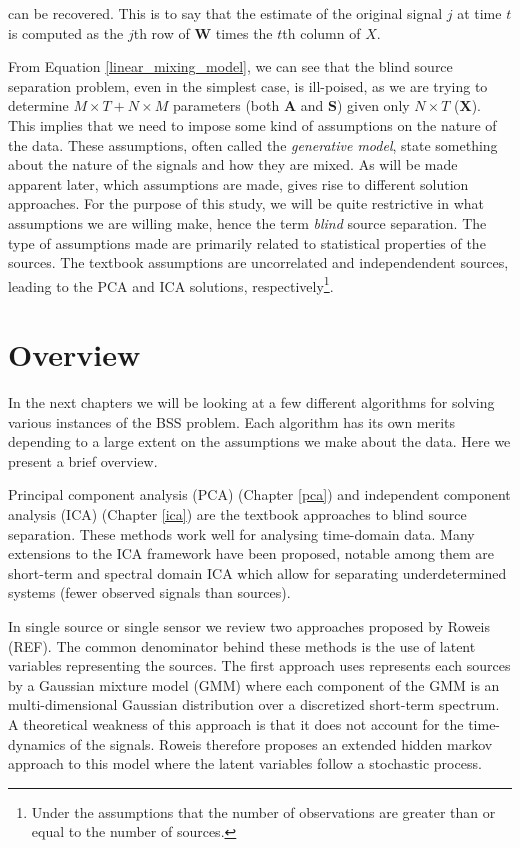 \documentclass[11pt, oneside, a4paper]{report}
\begin{document}
can be recovered. This is to say that the estimate of the original
signal $j$ at time $t$ is computed as the $j$th row of $\boldsymbol{W}$ times the
$t$th column of $X$.

From Equation \ref{linear_mixing_model}, we can see that the blind
source separation problem, even in the simplest case, is ill-poised,
as we are trying to determine $M\times T + N\times M$ parameters (both
$\boldsymbol{A}$ and $\boldsymbol{S}$) given only $N\times T$
($\boldsymbol{X}$). This implies that we need to impose some kind of
assumptions on the nature of the data. These assumptions, often called
the \emph{generative model}, state something about the nature of the
signals and how they are mixed. As will be made apparent later, which
assumptions are made, gives rise to different solution approaches. For
the purpose of this study, we will be quite restrictive in what
assumptions we are willing make, hence the term \emph{blind} source
separation. The type of assumptions made are primarily related to
statistical properties of the sources. The textbook assumptions are
uncorrelated and independendent sources, leading to the PCA and ICA
solutions, respectively\footnote{Under the assumptions that the number 
of observations are greater than or equal to the number of sources.}.




\section{Overview}

In the next chapters we will be looking at a few different algorithms
for solving various instances of the BSS problem. Each algorithm has
its own merits depending to a large extent on the assumptions we make
about the data. Here we present a brief overview.

Principal component analysis (PCA) (Chapter \ref{pca}) and independent
component analysis (ICA) (Chapter \ref{ica}) are the textbook approaches to blind source separation. These
methods work well for analysing time-domain data. Many extensions to
the ICA framework have been proposed, notable among them are
short-term and spectral domain ICA which allow for separating
underdetermined systems (fewer observed signals than sources). 

In single source or single sensor we review two approaches proposed by
Roweis (REF). The common denominator behind these methods is the use
of latent variables representing the sources. The first approach uses
represents each sources by a Gaussian mixture model (GMM) where each component
of the GMM is an multi-dimensional Gaussian distribution over a
discretized short-term spectrum. A theoretical weakness of this
approach is that it does not account for the time-dynamics of the
signals. Roweis therefore proposes an extended hidden markov approach
to this model where the latent variables follow a stochastic process. 
\end{document}
